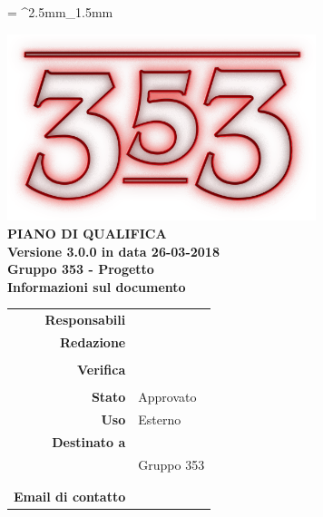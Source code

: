\documentclass[openany, a4paper, 12pt]{report}
\begin{document}
	
	\tabulinesep = ^2.5mm_1.5mm
	
	\begin{titlepage}
		\centering
		\vfill
		{
			\bfseries
			\vskip2cm
			\includegraphics[width=9cm]{../../common/images/logo.png} \\
			\vfill
			\Huge{PIANO DI QUALIFICA}\\
			\vfill
			\Large Versione 3.0.0 in data 26-03-2018\\ 
			\large Gruppo 353 - Progetto \progetto \\
			\vfill
			\normalsize Informazioni sul documento\\
			\begin{table}[htbp]
				\centering
				\renewcommand\arraystretch{1.2}
				\begin{tabular}{r|l}
					\hline
					\textbf{Responsabili}	& \Mirco \\
					
					\textbf{Redazione} 		& \Davide \\
											& \Gianluca \\
											
					\textbf{Verifica} 		& \Riccardo \\	
											& \Elena \\
											
					\textbf{Stato} 			& Approvato\\
					\textbf{Uso}			& Esterno\\
				\textbf{Destinato a}   	& \Proponente\\
										& Gruppo 353\\
										& \Vardanega\\
										& \Cardin\\
					
					\textbf{Email di contatto}	& \mailgroup
				\end{tabular}
			\end{table}
			\vfill
		}    
	\end{titlepage}
	
	\tableofcontents
	\listoftables
	\newpage
	
	
	
	
	
	\appendix
	
	
	
	
	
\end{document}
